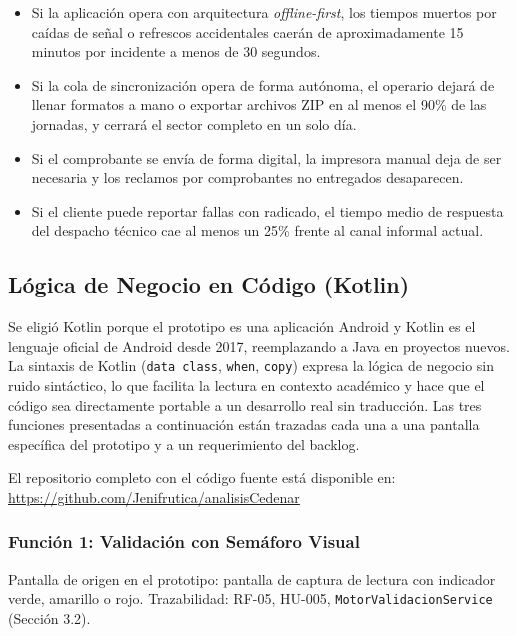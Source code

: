 \documentclass[12pt, a4paper]{article}
\begin{document}
\begin{itemize}
  \item Si la aplicación opera con arquitectura \textit{offline-first}, los tiempos muertos por caídas de señal o refrescos accidentales caerán de aproximadamente 15 minutos por incidente a menos de 30 segundos.
  \item Si la cola de sincronización opera de forma autónoma, el operario dejará de llenar formatos a mano o exportar archivos ZIP en al menos el 90\% de las jornadas, y cerrará el sector completo en un solo día.
  \item Si el comprobante se envía de forma digital, la impresora manual deja de ser necesaria y los reclamos por comprobantes no entregados desaparecen.
  \item Si el cliente puede reportar fallas con radicado, el tiempo medio de respuesta del despacho técnico cae al menos un 25\% frente al canal informal actual.
\end{itemize}

\newpage
\subsection{Lógica de Negocio en Código (Kotlin)}

\noindent Se eligió Kotlin porque el prototipo es una aplicación Android y Kotlin es el lenguaje oficial de Android desde 2017, reemplazando a Java en proyectos nuevos. La sintaxis de Kotlin (\texttt{data class}, \texttt{when}, \texttt{copy}) expresa la lógica de negocio sin ruido sintáctico, lo que facilita la lectura en contexto académico y hace que el código sea directamente portable a un desarrollo real sin traducción. Las tres funciones presentadas a continuación están trazadas cada una a una pantalla específica del prototipo y a un requerimiento del backlog.

El repositorio completo con el código fuente está disponible en: \url{https://github.com/Jenifrutica/analisisCedenar}

\clearpage
\subsubsection{Función 1: Validación con Semáforo Visual}

\noindent Pantalla de origen en el prototipo: pantalla de captura de lectura con indicador verde, amarillo o rojo. Trazabilidad: RF-05, HU-005, \texttt{MotorValidacionService} (Sección 3.2).
\end{document}
